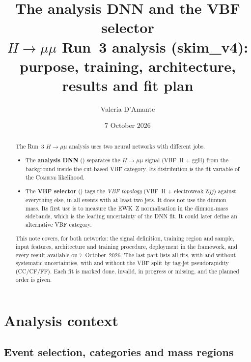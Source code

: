 \documentclass[11pt,a4paper]{article}
\title{The analysis DNN and the VBF selector\\[4pt]
\large $H\to\mu\mu$ Run~3 analysis (skim\_v4): purpose, training, architecture,\\
results and fit plan}
\author{Valeria D'Amante}
\date{7 October 2026}
\begin{document}
\maketitle

\begin{abstract}
\noindent
The Run~3 $H\to\mu\mu$ analysis uses two neural networks with different jobs.
\begin{itemize}
  \item The \textbf{analysis DNN} () separates the
  $H\to\mu\mu$ signal (VBF~H + ggH) from the background inside the cut-based VBF
  category. Its distribution is the fit variable of the \textsc{Combine}
  likelihood.
  \item The \textbf{VBF selector} () tags the
  \emph{VBF topology} (VBF~H + electroweak Z$jj$) against everything else, in all
  events with at least two jets. It does not use the dimuon mass. Its first use
  is to measure the EWK~Z normalisation in the dimuon-mass sidebands, which is
  the leading uncertainty of the DNN fit. It could later define an alternative
  VBF category.
\end{itemize}
This note covers, for both networks: the signal definition, training region and
sample, input features, architecture and training procedure, deployment in the
framework, and every result available on 7~October~2026. The last part lists
all fits, with and without systematic uncertainties, with and without the VBF
split by tag-jet pseudorapidity (CC/CF/FF). Each fit is marked done, invalid,
in progress or missing, and the planned order is given.
\end{abstract}

\tableofcontents
\newpage

\section{Analysis context}

\subsection{Event selection, categories and mass regions}
\end{document}
